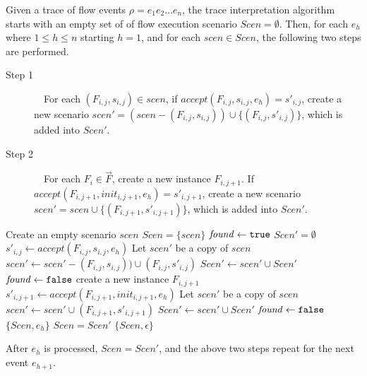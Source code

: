 \documentclass[12pt,frontmatter,copyright,thesis]{usfmanus}
\begin{document}
 Given a trace of flow events $\rho = e_1e_2\ldots e_n$, the
 trace interpretation algorithm starts with an empty set of
 of flow execution scenario $\mathit{Scen} = \emptyset$.
 Then, for each $e_h$ where $1 \leq h \leq n$ starting $h=1$,
 and for each $\mathit{scen} \in \mathit{Scen}$, the
 following two steps are performed.
  \begin{description}
 \item[Step 1]~~For each $(F_{i,j}, s_{i,j}) \in
   \mathit{scen}$, if $\mathit{accept}(F_{i,j}, s_{i,j}, e_h)
   =  s'_{i,j}$, create a new scenario
   $\mathit{scen}' = (\mathit{scen} - (F_{i,j}, s_{i,j}))
   \cup \{(F_{i,j}, s'_{i,j})\}$, which is added into
   $\mathit{Scen}'$.

 \item[Step 2]~~For each $F_i \in \vec{F}$, create a new
   instance $F_{i, j+1}$.  If $\mathit{accept}(F_{i,j+1},
   \mathit{init}_{i,j+1}, e_h) = s'_{i,j+1}$,
   create a new scenario $\mathit{scen}' = \mathit{scen} \cup
   \{(F_{i,j+1}, s'_{i,j+1})\}$, which is added into
   $\mathit{Scen}'$.
 \end{description}
\begin{algorithm}[h]
\DontPrintSemicolon
Create an empty scenario $scen$\;
$\mathit{Scen} = \{scen\}$\;
 {
	$\mathit{found} \gets {\tt true}$ \;
	$Scen' = \emptyset$\;
	 {
  		 {
		$ s'_{i,j} \gets \mathit{accept}(F_{i,j}, s_{i,j}, e_h) $\;
    		 {
				Let $scen'$ be a copy of $scen$\;
      		$\mathit{scen'} \gets \mathit{scen'} - (F_{i,j}, s_{i,j})) \cup (F_{i,j}, s'_{i,j})$\;
      		$\mathit{Scen'} \gets \mathit{scen'} \cup \mathit{Scen'}$\;
      		$\mathit{found} \gets {\tt false}$ \;
    		}
  		}
  		 {
      	create a new instance $F_{i, j+1}$ \;
	$s'_{i,j+1}\gets\mathit{accept}(F_{i,j+1},\mathit{init}_{i,j+1}, e_h) $\;
      	 {
    			Let $scen'$ be a copy of $scen$\;
				$\mathit{scen'} \gets \mathit{scen'} \cup (F_{i,j+1}, s'_{i,j+1})$ \;
				$\mathit{Scen'} \gets \mathit{scen'} \cup \mathit{Scen'}$\;
        		$\mathit{found} \gets {\tt false}$ \;
      	}
    	}
	}
   {
    \Return $\{Scen, e_h\}$\;
  }
  $Scen = Scen'$\;
}
\Return $\mathit{\{Scen, \epsilon\}}$ \;
\caption{$\textsc{Check-Compliance}(\vec{F}, \, \rho)$}
\label{algo:compliance}
\end{algorithm}
\clearpage
After $e_h$ is processed, $Scen = Scen'$, and the above two
 steps repeat for the next event $e_{h+1}$.
\end{document}
